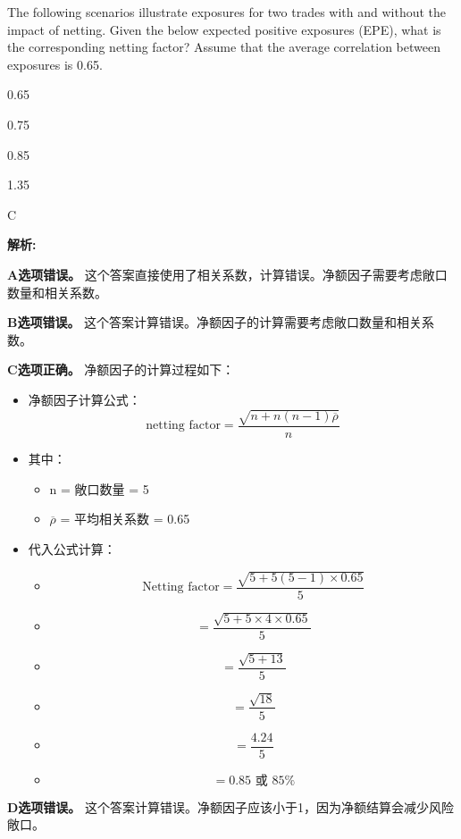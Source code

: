 \documentclass{article}
\newcounter{question} %
\newenvironment{explanation}
{\textbf{解析:}\par}
{\par}
\begin{document}
\begin{question}
    The following scenarios illustrate exposures for two trades with and without the impact of netting. Given the below expected positive exposures (EPE), what is the corresponding netting factor? Assume that the average correlation between exposures is 0.65.
\end{question}

\begin{choices}
    \item 0.65
    \item 0.75
    \item 0.85
    \item 1.35
\end{choices}

\begin{correctanswer}
    C
\end{correctanswer}

\begin{explanation}
    \textbf{A选项错误。}
    这个答案直接使用了相关系数，计算错误。净额因子需要考虑敞口数量和相关系数。

    \textbf{B选项错误。}
    这个答案计算错误。净额因子的计算需要考虑敞口数量和相关系数。

    \textbf{C选项正确。}
    净额因子的计算过程如下：
    \begin{itemize}
        \item 净额因子计算公式：\[ \text{netting factor} = \frac{\sqrt{n + n(n-1)\overline{\rho}}}{n} \]
        \item 其中：
        \begin{itemize}
            \item n = 敞口数量 = 5
            \item \(\overline{\rho}\) = 平均相关系数 = 0.65
        \end{itemize}
        \item 代入公式计算：
        \begin{itemize}
            \item \[ \text{Netting factor} = \frac{\sqrt{5 + 5(5-1) \times 0.65}}{5} \]
            \item \[ = \frac{\sqrt{5 + 5 \times 4 \times 0.65}}{5} \]
            \item \[ = \frac{\sqrt{5 + 13}}{5} \]
            \item \[ = \frac{\sqrt{18}}{5} \]
            \item \[ = \frac{4.24}{5} \]
            \item \[ = 0.85 \text{ 或 } 85\% \]
        \end{itemize}
    \end{itemize}

    \textbf{D选项错误。}
    这个答案计算错误。净额因子应该小于1，因为净额结算会减少风险敞口。
\end{explanation}
\end{document}
